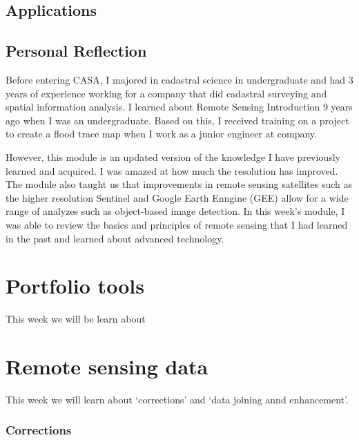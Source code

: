 \documentclass[
  letterpaper,
  DIV=11,
  numbers=noendperiod]{scrreprt}
\begin{document}
\hypertarget{applications}{%
\section{Applications}\label{applications}}

\hypertarget{personal-reflection}{%
\section{Personal Reflection}\label{personal-reflection}}

Before entering CASA, I majored in cadastral science in undergraduate
and had 3 years of experience working for a company that did cadastral
surveying and spatial information analysis. I learned about Remote
Sensing Introduction 9 years ago when I was an undergraduate. Based on
this, I received training on a project to create a flood trace map when
I work as a junior engineer at company.

However, this module is an updated version of the knowledge I have
previously learned and acquired. I was amazed at how much the resolution
has improved. The module also taught us that improvements in remote
sensing satellites such as the higher resolution Sentinel and Google
Earth Enngine (GEE) allow for a wide range of analyzes such as
object-based image detection. In this week's module, I was able to
review the basics and principles of remote sensing that I had learned in
the past and learned about advanced technology.


\hypertarget{portfolio-tools}{%
\chapter{Portfolio tools}\label{portfolio-tools}}

This week we will be learn about


\hypertarget{remote-sensing-data}{%
\chapter{Remote sensing data}\label{remote-sensing-data}}

This week we will learn about `corrections' and `data joining annd
enhancement'.

\hypertarget{corrections}{%
\subsection{Corrections}\label{corrections}}
\end{document}

